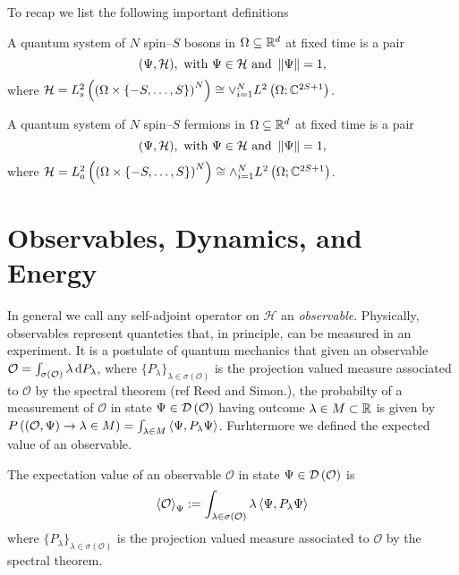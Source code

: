 		To recap we list the following important definitions
		\begin{definition}
			A quantum system of $N$ spin--$ S $ bosons in $ \Omega\subseteq\mathbb{R}^d $ at fixed time is a pair
			\begin{equation*}
			(\Psi,\mathcal{H}),\text{ with } \Psi\in\mathcal{H}\text{ and }\left\lVert \Psi \right\rVert=1,
			\end{equation*}
			where $ \mathcal{H}=L^2_{s}\left(\left(\Omega\times \{-S,\ldots,S\}\right)^N \right)\cong\vee_{i=1}^{N}L^2\left(\Omega; \mathbb{C}^{2S+1}\right) $.
		\end{definition}
		\begin{definition}
			A quantum system of $N$ spin--$ S $ fermions in $ \Omega\subseteq\mathbb{R}^d $ at fixed time is a pair
			\begin{equation*}
			(\Psi,\mathcal{H}),\text{ with } \Psi\in\mathcal{H}\text{ and }\left\lVert \Psi \right\rVert=1,
			\end{equation*}
			where $ \mathcal{H}=L^2_{a}\left(\left(\Omega\times \{-S,\ldots,S\}\right)^N \right)\cong\wedge_{i=1}^{N}L^2\left(\Omega; \mathbb{C}^{2S+1}\right) $.
		\end{definition}
	
\section{Observables, Dynamics, and Energy}
In general we call any self-adjoint operator on $ \mathcal{H} $ an \emph{observable}. Physically, observables represent quanteties that, in principle, can be measured in an experiment. It is a postulate of quantum mechanics that given an observable $ \mathcal{O}=\int_{\sigma(\mathcal{O})}\lambda \mathop{}\!\mathrm{d} P_\lambda $, where $\{P_\lambda\}_{\lambda\in\sigma(\mathcal{O})}$ is the projection valued measure associated to $ \mathcal{O} $ by the spectral theorem (ref Reed and Simon.), the probabilty of a measurement of $ \mathcal{O} $ in state $ \Psi\in\mathcal D\left(\mathcal{O}\right) $ having outcome $ \lambda\in M\subset \mathbb{R} $ is given by $ P\left((\mathcal{O},\Psi)\rightarrow\lambda\in M\right)=\int_{\lambda\in M} \left\langle\Psi,P_\lambda\Psi\right\rangle $. 
Furhtermore we defined the expected value of an observable.
\begin{definition}
	The expectation value of an observable $ \mathcal{O} $ in state $ \Psi\in\mathcal D\left(\mathcal{O}\right) $ is 
	$$ \left\langle\mathcal{O}\right\rangle_\Psi:=\int_{\lambda\in\sigma(\mathcal{O})}\lambda\left\langle\Psi,P_\lambda\Psi\right\rangle $$
	where $\{P_\lambda\}_{\lambda\in\sigma(\mathcal{O})}$ is the projection valued measure associated to $ \mathcal{O} $ by the spectral theorem.
\end{definition}


